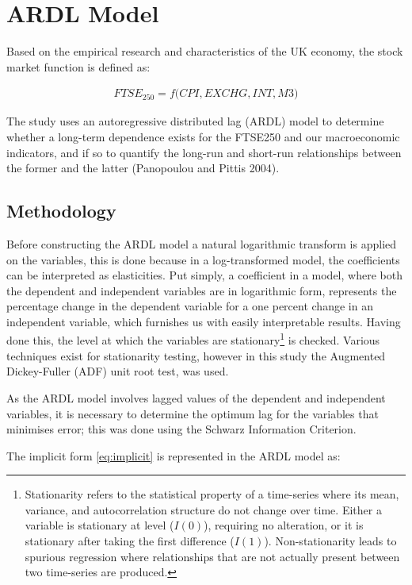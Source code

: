 \documentclass[11pt,a4paper]{article}
\begin{document}
\section{ARDL Model}

Based on the empirical research and characteristics of the UK economy,
the stock market function is defined as:

\begin{align}
    FTSE_{250} = f\biggl(CPI, EXCHG, INT, M3\biggr) \label{eq:implicit}
\end{align}

The study uses an autoregressive distributed lag (ARDL) model to determine 
whether a long-term dependence exists for the FTSE250 and our macroeconomic 
indicators, and if so to quantify the long-run and short-run relationships
between the former and the latter (Panopoulou and Pittis 2004).

\subsection{Methodology}

Before constructing the ARDL model a natural logarithmic transform is applied
on the variables, this is done because in a log-transformed model,
the coefficients can be interpreted as elasticities. Put simply, 
a coefficient in a model, where both the dependent and independent variables
are in logarithmic form, represents the percentage change in the 
dependent variable for a one percent change in an independent variable, 
which furnishes us with easily interpretable results. Having done this,
the level at which the variables are stationary\footnote{Stationarity refers to the statistical property of a time-series where 
its mean, variance, and autocorrelation structure do not change over time. Either a variable is stationary at level ($I(0)$), requiring no alteration,
or it is stationary after taking the first difference ($I(1)$). 
Non-stationarity leads to spurious regression where relationships that 
are not actually present between two time-series are produced.} is checked.
Various techniques exist for stationarity testing, however in this study the 
Augmented Dickey-Fuller (ADF) unit root test, was used. 

As the ARDL model involves lagged values of the dependent and independent 
variables, it is necessary to determine the optimum lag for the variables 
that minimises error; this was done using the Schwarz
Information Criterion.

The implicit form \eqref{eq:implicit} is represented in the ARDL model as:
\end{document}
